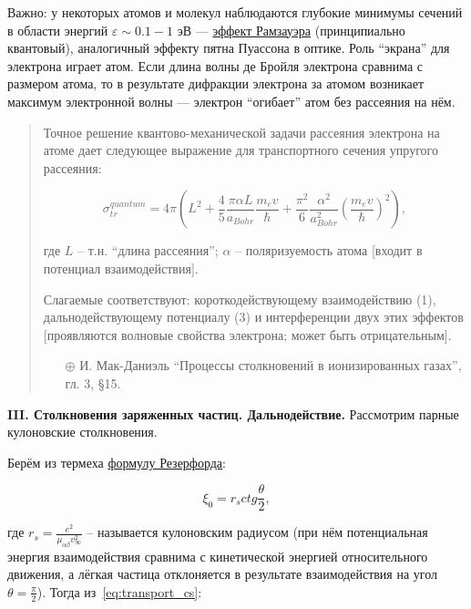 \documentclass[10pt, a4paper]{article}
\begin{document}
Важно: у некоторых атомов и молекул наблюдаются глубокие минимумы сечений в области энергий $\varepsilon \sim 0.1-1$ эВ --- \uline{эффект Рамзауэра} \cite{raizer} (принципиально квантовый), аналогичный эффекту пятна Пуассона в оптике. Роль ``экрана'' для электрона играет атом. Если длина волны де Бройля электрона сравнима с размером атома, то в результате дифракции электрона за атомом возникает максимум электронной волны — электрон ``огибает'' атом без рассеяния на нём.

\begin{quotation}
	
	Точное решение квантово-механической задачи рассеяния электрона на атоме дает следующее выражение для транспортного сечения упругого рассеяния:
	
	\begin{equation*}
		\sigma_{tr}^{quantum} = 4\pi \left(L^{2}+\frac{4}{5}\frac{\pi \alpha L}{a_{Bohr}}\frac{m_ev}{\hbar}+\frac{\pi^{2}}{6}\frac{\alpha^{2}}{a_{Bohr}^{2}}\left( \frac{m_ev}{\hbar}\right) ^{2} \right), 
	\end{equation*}
	
	где $L$ -- т.н. ``длина рассеяния''; $\alpha$ -- поляризуемость атома [входит в потенциал взаимодействия].
	
	Слагаемые соответствуют: короткодействующему взаимодействию (1), дальнодействующему потенциалу (3) и интерференции двух этих эффектов [проявляются волновые свойства электрона; может быть отрицательным].
	
	\begin{itemize}
		\item[$\oplus$] И. Мак-Даниэль ``Процессы столкновений в ионизированных газах'', гл. 3, \S 15.
	\end{itemize}
	
\end{quotation}

{\bfseries \large III. Столкновения заряженных частиц. Дальнодействие.} Рассмотрим парные кулоновские столкновения.

Берём из термеха \uline{формулу Резерфорда}:

\begin{equation} \label{eq:Rutherford}
	\xi_0 = r_s ctg\frac{\theta}{2},
\end{equation}

где $r_s = \frac{e^2}{\mu_{\alpha\beta}v_\infty^2}$ -- называется кулоновским радиусом (при нём потенциальная энергия взаимодействия сравнима с кинетической энергией относительного движения, а лёгкая частица отклоняется в результате взаимодействия на угол $\theta=\frac{\pi}{2}$\cite{raizer}). Тогда из~\eqref{eq:transport_cs}:
\end{document}

